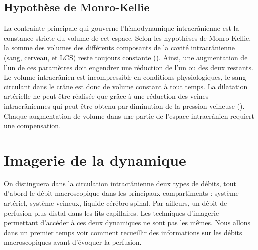 \subsection{Hypothèse de Monro-Kellie}
La contrainte principale qui gouverne l’hémodynamique intracrânienne est la constance stricte
du volume de cet espace. Selon les hypothèses de Monro-Kellie, la somme des volumes des différents
composants de la cavité intracrânienne (sang, cerveau, et LCS) reste toujours constante (\cite{Carmelo2002}). Ainsi, une
augmentation de l’un de ces paramètres doit engendrer une réduction de l’un ou des deux restants.
Le volume intracrânien est incompressible en conditions physiologiques, le sang circulant dans le crâne
est donc de volume constant à tout temps. La dilatation artérielle ne peut être réalisée que grâce à
une réduction des veines intracrâniennes qui peut être obtenu par diminution de la pression veineuse
(\cite{Wei1982}). Chaque augmentation de volume dans une partie de l’espace intracrânien requiert une
compensation.
\section{Imagerie de la dynamique}
On distinguera dans la circulation intracrânienne deux types de débits, tout d’abord le débit
macroscopique dans les principaux compartiments : système artériel, système veineux, liquide
cérébro-spinal. Par ailleurs, un débit de perfusion plus distal dans les lits capillaires. Les techniques
d’imagerie permettant d’accéder à ces deux dynamiques ne sont pas les mêmes. Nous allons dans un
premier temps voir comment recueillir des informations sur les débits macroscopiques avant
d’évoquer la perfusion.

